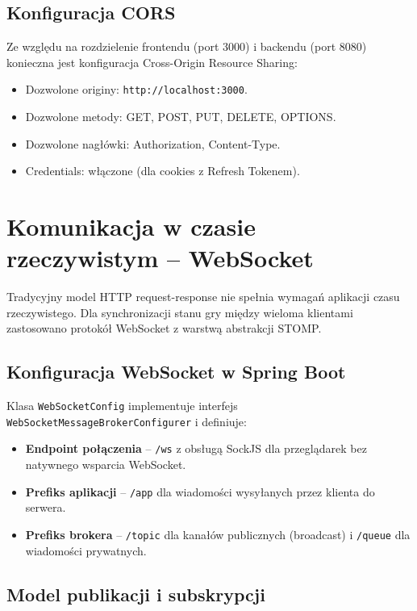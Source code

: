 ﻿\documentclass[a4paper,twoside,11pt]{mwrep}
\theoremstyle{plain} \newtheorem{thm}{Twierdzenie}
\theoremstyle{plain} \newtheorem{lem}{Lemat}
\theoremstyle{definition} \newtheorem{defn}{Definicja}
\theoremstyle{remark} \newtheorem*{rem}{Wniosek}
\begin{document}
\subsection{Konfiguracja CORS}

Ze względu na rozdzielenie frontendu (port 3000) i backendu (port 8080) konieczna jest konfiguracja Cross-Origin Resource Sharing:
\begin{itemize}
    \item Dozwolone originy: \texttt{http://localhost:3000}.
    \item Dozwolone metody: GET, POST, PUT, DELETE, OPTIONS.
    \item Dozwolone nagłówki: Authorization, Content-Type.
    \item Credentials: włączone (dla cookies z Refresh Tokenem).
\end{itemize}

\section{Komunikacja w czasie rzeczywistym -- WebSocket}

Tradycyjny model HTTP request-response nie spełnia wymagań aplikacji czasu rzeczywistego. Dla synchronizacji stanu gry między wieloma klientami zastosowano protokół WebSocket z warstwą abstrakcji STOMP.

\subsection{Konfiguracja WebSocket w Spring Boot}

Klasa \texttt{WebSocketConfig} implementuje interfejs \texttt{WebSocketMessageBrokerConfigurer} i definiuje:

\begin{itemize}
    \item \textbf{Endpoint połączenia} -- \texttt{/ws} z obsługą SockJS dla przeglądarek bez natywnego wsparcia WebSocket.
    \item \textbf{Prefiks aplikacji} -- \texttt{/app} dla wiadomości wysyłanych przez klienta do serwera.
    \item \textbf{Prefiks brokera} -- \texttt{/topic} dla kanałów publicznych (broadcast) i \texttt{/queue} dla wiadomości prywatnych.
\end{itemize}

\subsection{Model publikacji i subskrypcji}
\end{document}
